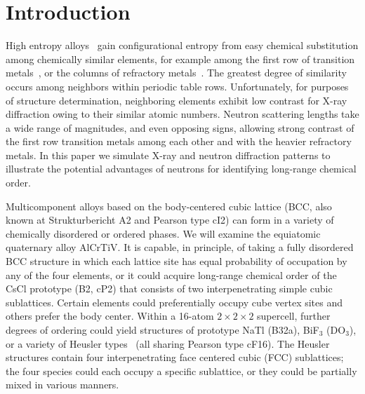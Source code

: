 \documentclass[twoside,12pt]{article}
\begin{document}
\vspace{1cm}


\renewcommand*\rmdefault{bch}\normalfont\upshape
\rmfamily
\section*{}
\vspace{-1cm}




\section{Introduction}
\label{sec:Intro}

High entropy alloys~\cite{Yeh04_1,Cantor04} gain configurational entropy from easy chemical substitution among chemically similar elements, for example among the first row of transition metals~\cite{yeh04_2}, or the columns of refractory metals~\cite{Senkov10}. The greatest degree of similarity occurs among neighbors within periodic table rows. Unfortunately, for purposes of structure determination, neighboring elements exhibit low contrast for X-ray diffraction owing to their similar atomic numbers. Neutron scattering lengths take a wide range of magnitudes, and even opposing signs, allowing strong contrast of the first row transition metals among each other and with the heavier refractory metals. In this paper we simulate X-ray and neutron diffraction patterns to illustrate the potential advantages of neutrons for identifying long-range chemical order.

Multicomponent alloys based on the body-centered cubic lattice (BCC, also known at Strukturbericht A2 and Pearson type cI2) can form in a variety of chemically disordered or ordered phases. We will examine the equiatomic quaternary alloy AlCrTiV. It is capable, in principle, of taking a fully disordered BCC structure in which each lattice site has equal probability of occupation by any of the four elements, or it could acquire long-range chemical order of the CsCl prototype (B2, cP2) that consists of two interpenetrating simple cubic sublattices. Certain elements could preferentially occupy cube vertex sites and others prefer the body center. Within a 16-atom $2\times 2\times 2$ supercell, further degrees of ordering could yield structures of prototype NaTl (B32a), BiF$_3$ (DO$_3$), or a variety of Heusler types~\cite{Galanakis_2016,Hoffman2021} (all sharing Pearson type cF16). The Heusler structures contain four interpenetrating face centered cubic (FCC) sublattices; the four species could each occupy a specific sublattice, or they could be partially mixed in various manners.
\end{document}
